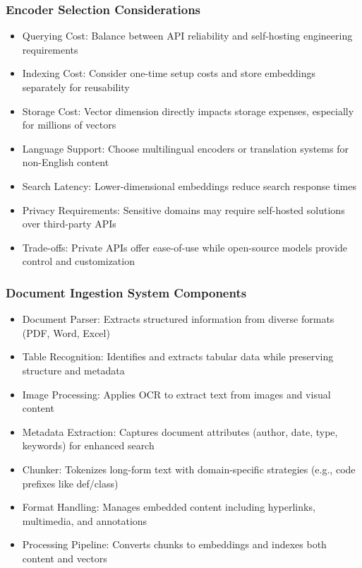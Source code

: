 \begin{frame}[fragile]\frametitle{Encoder Selection Considerations}
      \begin{itemize}
        \item Querying Cost: Balance between API reliability and self-hosting engineering requirements
        \item Indexing Cost: Consider one-time setup costs and store embeddings separately for reusability
        \item Storage Cost: Vector dimension directly impacts storage expenses, especially for millions of vectors
        \item Language Support: Choose multilingual encoders or translation systems for non-English content
        \item Search Latency: Lower-dimensional embeddings reduce search response times
        \item Privacy Requirements: Sensitive domains may require self-hosted solutions over third-party APIs
        \item Trade-offs: Private APIs offer ease-of-use while open-source models provide control and customization
      \end{itemize}
\end{frame}

\begin{frame}[fragile]\frametitle{Document Ingestion System Components}
      \begin{itemize}
        \item Document Parser: Extracts structured information from diverse formats (PDF, Word, Excel)
        \item Table Recognition: Identifies and extracts tabular data while preserving structure and metadata
        \item Image Processing: Applies OCR to extract text from images and visual content
        \item Metadata Extraction: Captures document attributes (author, date, type, keywords) for enhanced search
        \item Chunker: Tokenizes long-form text with domain-specific strategies (e.g., code prefixes like def/class)
        \item Format Handling: Manages embedded content including hyperlinks, multimedia, and annotations
        \item Processing Pipeline: Converts chunks to embeddings and indexes both content and vectors
      \end{itemize}
\end{frame}

